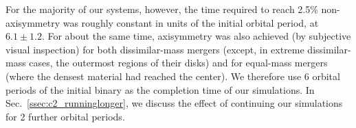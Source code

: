 For the majority of our systems, however, the time required to reach 2.5\% non-axisymmetry was roughly constant in units of the initial orbital period, at $6.1\pm1.2$.  For about the same time, axisymmetry was also achieved (by subjective visual inspection) for both dissimilar-mass mergers (except, in extreme dissimilar-mass cases, the outermost regions of their disks) and for equal-mass mergers (where the densest material had reached the center).  We therefore use 6 orbital periods of the initial binary as the completion time of our simulations.  In Sec.~\ref{ssec:c2_runninglonger}, we discuss the effect of continuing our simulations for 2 further orbital periods.

